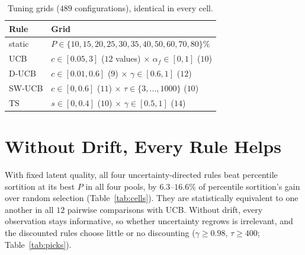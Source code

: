 \documentclass[sigconf,anonymous,review,nonacm]{acmart}
\begin{document}
\begin{table}[t]\centering\small
\caption{Tuning grids ($489$ configurations), identical in every cell.}
\label{tab:grids}
\setlength{\tabcolsep}{4pt}
\begin{tabular}{ll}
\toprule
Rule & Grid\\
\midrule
static & $P\in\{10,15,20,25,30,35,40,50,60,70,80\}\%$\\
UCB & $c\in[0.05,3]$ ($12$ values) $\times$ $\alpha_f\in[0,1]$ ($10$)\\
D-UCB & $c\in[0.01,0.6]$ ($9$) $\times$ $\gamma\in[0.6,1]$ ($12$)\\
SW-UCB & $c\in[0,0.6]$ ($11$) $\times$ $\tau\in\{3,\dots,1000\}$ ($10$)\\
TS & $s\in[0,0.4]$ ($10$) $\times$ $\gamma\in[0.5,1]$ ($14$)\\
\bottomrule
\end{tabular}
\end{table}

\section{Without Drift, Every Rule Helps}
\label{sec:stationary}

\begin{table}[t]\centering\small
\caption{Each rule against percentile sortition tuned to its best $P^\star$ (top) and rule
against rule (bottom), in every pool and drift rate: paired difference in $M_1$ on $100$
evaluation seeds, as a percentage of that cell's gap between tuned percentile sortition and
random selection. \textbf{Bold}: win, \underline{underlined}: loss (Holm-adjusted $p<0.05$
over all $108$ comparisons); otherwise equivalent within $\pm0.005$ by TOST.}
\label{tab:cells}
\setlength{\tabcolsep}{3.5pt}

\end{table}

\begin{table}[t]\centering\small
\caption{Configurations picked on the tuning seeds, per cell.}
\label{tab:picks}
\setlength{\tabcolsep}{4pt}

\end{table}

With fixed latent quality, all four uncertainty-directed rules beat percentile sortition at
its best $P$ in all four pools, by $6.3$--$16.6\%$ of percentile sortition's gain
over random selection (Table~\ref{tab:cells}). They are statistically equivalent to one
another in all $12$ pairwise comparisons with UCB. Without drift, every observation stays
informative, so whether uncertainty regrows is irrelevant, and the discounted rules choose
little or no discounting ($\gamma\ge0.98$, $\tau\ge400$; Table~\ref{tab:picks}).
\end{document}
